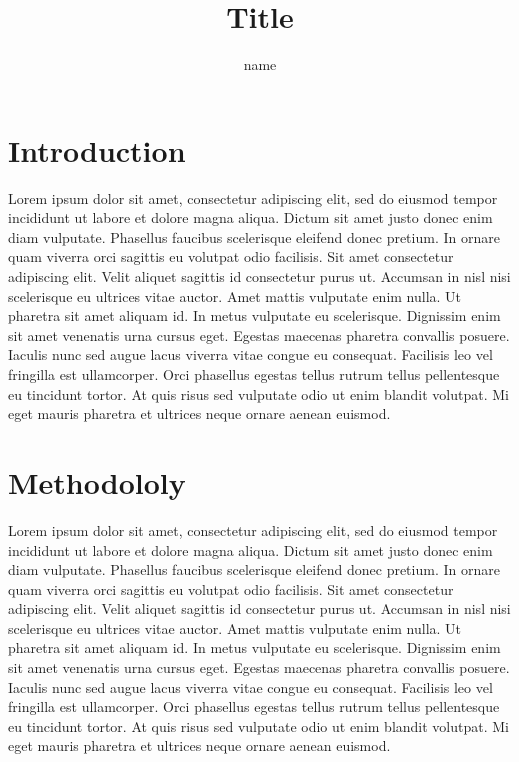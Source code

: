 \documentclass[letterpaper,10pt]{article}
\begin{document}
\title{Title}


\author{name }

\address{  University..}







\section{Introduction}

Lorem ipsum dolor sit amet, consectetur adipiscing elit, sed do eiusmod tempor incididunt ut labore et dolore magna aliqua. Dictum sit amet justo donec enim diam vulputate. Phasellus faucibus scelerisque eleifend donec pretium. In ornare quam viverra orci sagittis eu volutpat odio facilisis. Sit amet consectetur adipiscing elit. Velit aliquet sagittis id consectetur purus ut. Accumsan in nisl nisi scelerisque eu ultrices vitae auctor. Amet mattis vulputate enim nulla. Ut pharetra sit amet aliquam id. In metus vulputate eu scelerisque. Dignissim enim sit amet venenatis urna cursus eget. Egestas maecenas pharetra convallis posuere. Iaculis nunc sed augue lacus viverra vitae congue eu consequat. Facilisis leo vel fringilla est ullamcorper. Orci phasellus egestas tellus rutrum tellus pellentesque eu tincidunt tortor. At quis risus sed vulputate odio ut enim blandit volutpat. Mi eget mauris pharetra et ultrices neque ornare aenean euismod.
\section{Methodololy}
Lorem ipsum dolor sit amet, consectetur adipiscing elit, sed do eiusmod tempor incididunt ut labore et dolore magna aliqua. Dictum sit amet justo donec enim diam vulputate. Phasellus faucibus scelerisque eleifend donec pretium. In ornare quam viverra orci sagittis eu volutpat odio facilisis. Sit amet consectetur adipiscing elit. Velit aliquet sagittis id consectetur purus ut. Accumsan in nisl nisi scelerisque eu ultrices vitae auctor. Amet mattis vulputate enim nulla. Ut pharetra sit amet aliquam id. In metus vulputate eu scelerisque. Dignissim enim sit amet venenatis urna cursus eget. Egestas maecenas pharetra convallis posuere. Iaculis nunc sed augue lacus viverra vitae congue eu consequat. Facilisis leo vel fringilla est ullamcorper. Orci phasellus egestas tellus rutrum tellus pellentesque eu tincidunt tortor. At quis risus sed vulputate odio ut enim blandit volutpat. Mi eget mauris pharetra et ultrices neque ornare aenean euismod.
\end{document}
